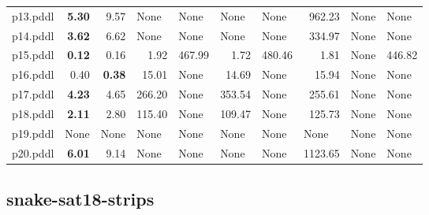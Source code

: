 \documentclass{article}
\begin{document}
\begin{tabular}{@{}lrrrrrrrrr@{}}
p13.pddl & \textbf{5.30} & 9.57 & \multicolumn{1}{|l|}{None} & \multicolumn{1}{|l|}{None} & \multicolumn{1}{|l|}{None} & \multicolumn{1}{|l|}{None} & 962.23 & \multicolumn{1}{|l|}{None} & \multicolumn{1}{|l|}{None} \\
p14.pddl & \textbf{3.62} & 6.62 & \multicolumn{1}{|l|}{None} & \multicolumn{1}{|l|}{None} & \multicolumn{1}{|l|}{None} & \multicolumn{1}{|l|}{None} & 334.97 & \multicolumn{1}{|l|}{None} & \multicolumn{1}{|l|}{None} \\
p15.pddl & \textbf{0.12} & 0.16 & 1.92 & 467.99 & 1.72 & 480.46 & 1.81 & \multicolumn{1}{|l|}{None} & 446.82 \\
p16.pddl & 0.40 & \textbf{0.38} & 15.01 & \multicolumn{1}{|l|}{None} & 14.69 & \multicolumn{1}{|l|}{None} & 15.94 & \multicolumn{1}{|l|}{None} & \multicolumn{1}{|l|}{None} \\
p17.pddl & \textbf{4.23} & 4.65 & 266.20 & \multicolumn{1}{|l|}{None} & 353.54 & \multicolumn{1}{|l|}{None} & 255.61 & \multicolumn{1}{|l|}{None} & \multicolumn{1}{|l|}{None} \\
p18.pddl & \textbf{2.11} & 2.80 & 115.40 & \multicolumn{1}{|l|}{None} & 109.47 & \multicolumn{1}{|l|}{None} & 125.73 & \multicolumn{1}{|l|}{None} & \multicolumn{1}{|l|}{None} \\
p19.pddl & \multicolumn{1}{|l|}{None} & \multicolumn{1}{|l|}{None} & \multicolumn{1}{|l|}{None} & \multicolumn{1}{|l|}{None} & \multicolumn{1}{|l|}{None} & \multicolumn{1}{|l|}{None} & \multicolumn{1}{|l|}{None} & \multicolumn{1}{|l|}{None} & \multicolumn{1}{|l|}{None} \\
p20.pddl & \textbf{6.01} & 9.14 & \multicolumn{1}{|l|}{None} & \multicolumn{1}{|l|}{None} & \multicolumn{1}{|l|}{None} & \multicolumn{1}{|l|}{None} & 1123.65 & \multicolumn{1}{|l|}{None} & \multicolumn{1}{|l|}{None} \\
\end{tabular}

\hypertarget{search_start_time-snake-sat18-strips}{}
\subsection*{snake-sat18-strips}
\end{document}
